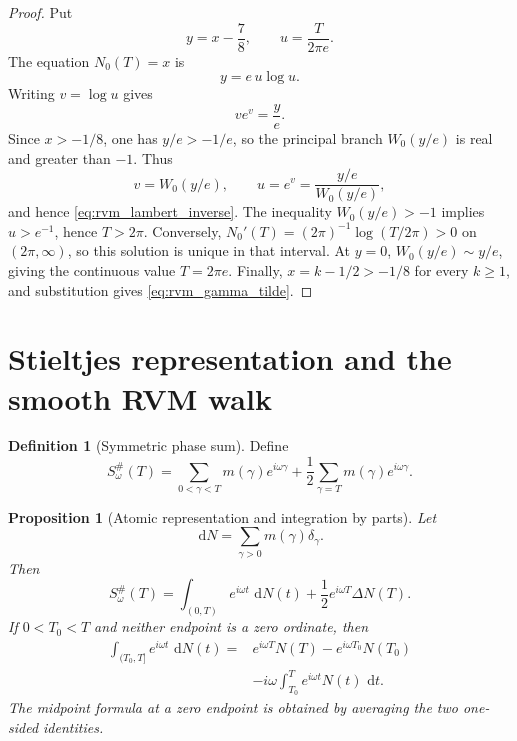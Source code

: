 \documentclass[11pt]{amsart}
\numberwithin{equation}{section}
\theoremstyle{plain}
\newtheorem{proposition}[theorem]{Proposition}
\theoremstyle{definition}
\newtheorem{definition}[theorem]{Definition}
\theoremstyle{remark}
\newcommand{\1}{\mathbf{1}}
\newcommand{\dd}{\,\mathrm{d}}
\begin{document}
\begin{proof}
Put
\begin{equation}
y=x-\frac78,
\qquad
u=\frac{T}{2\pi e}.
\label{eq:rvm_inverse_variables}
\end{equation}
The equation \(N_0(T)=x\) is
\begin{equation}
y=e\,u\log u.
\label{eq:rvm_inverse_step_one}
\end{equation}
Writing \(v=\log u\) gives
\begin{equation}
ve^v=\frac ye.
\label{eq:rvm_inverse_step_two}
\end{equation}
Since \(x>-1/8\), one has \(y/e>-1/e\), so the principal branch
\(W_0(y/e)\) is real and greater than \(-1\).  Thus
\begin{equation}
v=W_0(y/e),
\qquad
u=e^v=\frac{y/e}{W_0(y/e)},
\label{eq:rvm_inverse_step_three}
\end{equation}
and hence \eqref{eq:rvm_lambert_inverse}.  The inequality
\(W_0(y/e)>-1\) implies \(u>e^{-1}\), hence \(T>2\pi\).
Conversely, \(N_0'(T)=(2\pi)^{-1}\log(T/2\pi)>0\) on \((2\pi,\infty)\),
so this solution is unique in that interval.  At \(y=0\),
\(W_0(y/e)\sim y/e\), giving the continuous value \(T=2\pi e\).
Finally, \(x=k-1/2>-1/8\) for every \(k\geq1\), and substitution gives
\eqref{eq:rvm_gamma_tilde}.
\end{proof}

\section{Stieltjes representation and the smooth RVM walk}
\label{sec:stieltjes_rvm_walk}

\begin{definition}[Symmetric phase sum]
\label{def:symmetric_phase_sum}
Define
\begin{equation}
S_\omega^{\#}(T)
=
\sum_{0<\gamma<T}m(\gamma)e^{i\omega\gamma}
+
\frac12
\sum_{\gamma=T}m(\gamma)e^{i\omega\gamma}.
\label{eq:symmetric_phase_sum}
\end{equation}
\end{definition}

\begin{proposition}[Atomic representation and integration by parts]
\label{prop:stieltjes_phase_sum}
Let
\begin{equation}
\dd N
=
\sum_{\gamma>0}m(\gamma)\delta_\gamma.
\label{eq:dN_atomic}
\end{equation}
Then
\begin{equation}
\boxed{
S_\omega^{\#}(T)
=
\int_{(0,T)}e^{i\omega t}\,\dd N(t)
+
\frac12e^{i\omega T}\Delta N(T).
}
\label{eq:stieltjes_phase_sum}
\end{equation}
If \(0<T_0<T\) and neither endpoint is a zero ordinate, then
\begin{align}
\int_{(T_0,T]}e^{i\omega t}\,\dd N(t)
={}&
e^{i\omega T}N(T)-e^{i\omega T_0}N(T_0)
\label{eq:stieltjes_integration_by_parts_one}
\\
&-
i\omega\int_{T_0}^{T}e^{i\omega t}N(t)\,\dd t.
\label{eq:stieltjes_integration_by_parts_two}
\end{align}
The midpoint formula at a zero endpoint is obtained by averaging the two
one-sided identities.
\end{proposition}
\end{document}
